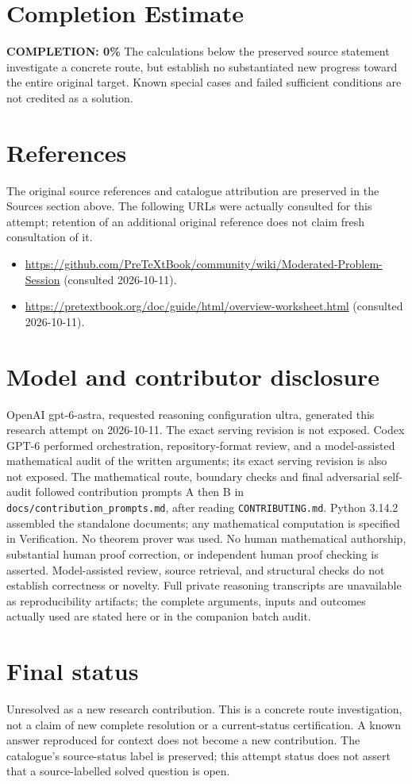\documentclass[11pt]{article}
\begin{document}
\section{Completion Estimate}
\noindent\textbf{COMPLETION: 0\%}
The calculations below the preserved source statement investigate a concrete route,
but establish no substantiated new progress toward the entire original target.
Known special cases and failed sufficient conditions are not credited as a solution.
\section{References}
The original source references and catalogue attribution are preserved in the
Sources section above. The following URLs were actually consulted for this attempt;
retention of an additional original reference does not claim fresh consultation of it.
\begin{itemize}
\item \url{https://github.com/PreTeXtBook/community/wiki/Moderated-Problem-Session} (consulted 2026-10-11). 
\item \url{https://pretextbook.org/doc/guide/html/overview-worksheet.html} (consulted 2026-10-11). 
\end{itemize}
\section{Model and contributor disclosure}
OpenAI gpt-6-astra, requested reasoning configuration ultra, generated this research
attempt on 2026-10-11. The exact serving revision is not exposed. Codex GPT-6
performed orchestration, repository-format review, and a model-assisted mathematical
audit of the written arguments; its exact serving revision
is also not exposed. The mathematical route, boundary checks and final adversarial
self-audit followed contribution prompts A then B in
\texttt{docs/contribution\_prompts.md}, after reading \texttt{CONTRIBUTING.md}.
Python 3.14.2 assembled the standalone documents; any mathematical computation is
specified in Verification. No theorem prover was used. No human mathematical
authorship, substantial human proof correction, or independent human proof checking
is asserted. Model-assisted review, source retrieval, and structural checks do not
establish correctness or novelty. Full private reasoning transcripts are unavailable
as reproducibility artifacts; the complete arguments, inputs and outcomes actually
used are stated here or in the companion batch audit.
\section{Final status}
Unresolved as a new research contribution. This is a concrete route investigation,
not a claim of new complete resolution or a current-status certification. A known
answer reproduced for context does not become a new contribution. The catalogue's
source-status label is preserved; this attempt status does not assert that a
source-labelled solved question is open.
\end{document}

